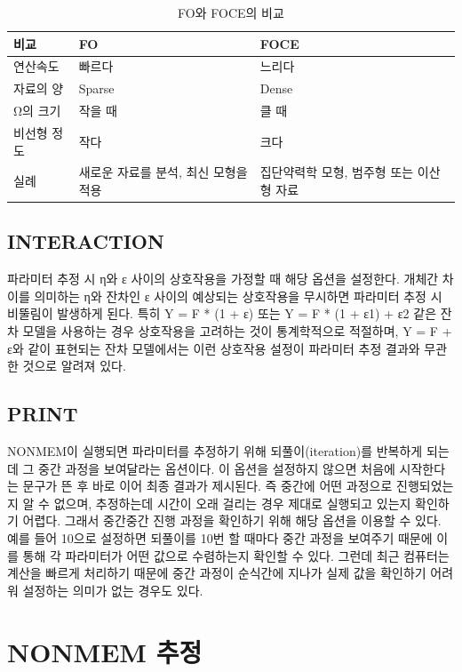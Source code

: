 \documentclass[
  10pt,
]{krantz}
\begin{document}
\begin{table}

\caption{\label{tab:fofoce}FO와 FOCE의 비교}
\centering
\begin{tabular}[t]{l|l|l}
\hline
비교 & FO & FOCE\\
\hline
연산속도 & 빠르다 & 느리다\\
\hline
자료의 양 & Sparse & Dense\\
\hline
Ω의 크기 & 작을 때 & 클 때\\
\hline
비선형 정도 & 작다 & 크다\\
\hline
실례 & 새로운 자료를 분석, 최신 모형을 적용 & 집단약력학 모형, 범주형 또는 이산형 자료\\
\hline
\end{tabular}
\end{table}

\hypertarget{interaction}{%
\subsection{INTERACTION}\label{interaction}}

파라미터 추정 시 η와 ε 사이의 상호작용을 가정할 때 해당 옵션을 설정한다. 개체간 차이를 의미하는 η와 잔차인 ε 사이의 예상되는 상호작용을 무시하면 파라미터 추정 시 비뚤림이 발생하게 된다. 특히 Y = F * (1 + ε) 또는 Y = F * (1 + ε1) + ε2 같은 잔차 모델을 사용하는 경우 상호작용을 고려하는 것이 통계학적으로 적절하며, Y = F + ε와 같이 표현되는 잔차 모델에서는 이런 상호작용 설정이 파라미터 추정 결과와 무관한 것으로 알려져 있다.

\hypertarget{print}{%
\subsection{PRINT}\label{print}}

NONMEM이 실행되면 파라미터를 추정하기 위해 되풀이(iteration)를 반복하게 되는데 그 중간 과정을 보여달라는 옵션이다. 이 옵션을 설정하지 않으면 처음에 시작한다는 문구가 뜬 후 바로 이어 최종 결과가 제시된다. 즉 중간에 어떤 과정으로 진행되었는지 알 수 없으며, 추정하는데 시간이 오래 걸리는 경우 제대로 실행되고 있는지 확인하기 어렵다. 그래서 중간중간 진행 과정을 확인하기 위해 해당 옵션을 이용할 수 있다. 예를 들어 10으로 설정하면 되풀이를 10번 할 때마다 중간 과정을 보여주기 때문에 이를 통해 각 파라미터가 어떤 값으로 수렴하는지 확인할 수 있다. 그런데 최근 컴퓨터는 계산을 빠르게 처리하기 때문에 중간 과정이 순식간에 지나가 실제 값을 확인하기 어려워 설정하는 의미가 없는 경우도 있다.

\hypertarget{nonmem-uxcd94uxc815}{%
\section{NONMEM 추정}\label{nonmem-uxcd94uxc815}}
\end{document}

